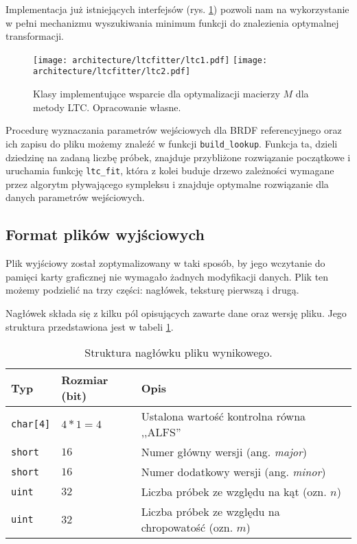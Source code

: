 \documentclass[../main.tex]{subfiles}
\newcommand{\graphvizscale}{0.09}
\begin{document}
Implementacja już istniejących interfejsów (rys. \ref{fig:LTCClassDiagram}) pozwoli nam na wykorzystanie w pełni mechanizmu wyszukiwania minimum funkcji do znalezienia optymalnej transformacji.

\begin{figure}[h]
    \centering
    \texttt{[image: architecture/ltcfitter/ltc1.pdf]}
    \texttt{[image: architecture/ltcfitter/ltc2.pdf]}
    \caption{Klasy implementujące wsparcie dla optymalizacji macierzy $M$ dla metody LTC. Opracowanie własne.}
    \label{fig:LTCClassDiagram}
\end{figure}

Procedurę wyznaczania parametrów wejściowych dla BRDF referencyjnego oraz ich zapisu do pliku możemy znaleźć w funkcji \texttt{build\_lookup}. Funkcja ta, dzieli dziedzinę na zadaną liczbę próbek, znajduje przybliżone rozwiązanie początkowe i uruchamia funkcję \texttt{ltc\_fit}, która z kolei buduje drzewo zależności wymagane przez algorytm pływającego sympleksu i znajduje optymalne rozwiązanie dla danych parametrów wejściowych.

\subsection{Format plików wyjściowych}

Plik wyjściowy został zoptymalizowany w taki sposób, by jego wczytanie do pamięci karty graficznej nie wymagało żadnych modyfikacji danych. Plik ten możemy podzielić na trzy części: nagłówek, teksturę pierwszą i drugą.

Nagłówek składa się z kilku pól opisujących zawarte dane oraz wersję pliku. Jego struktura przedstawiona jest w tabeli \ref{tab:alf_header}.

\begin{table}[h]
    \centering
    \begin{tabular}{|l|l|l|}
        \hline
        Typ & Rozmiar (bit) & Opis \\ \hline 
        \texttt{char[4]} & $4*1=4$ & Ustalona wartość kontrolna równa ,,ALFS'' \\ \hline
        \texttt{short} & $16$ & Numer główny wersji (ang. \textit{major}) \\ \hline
        \texttt{short} & $16$ & Numer dodatkowy wersji  (ang. \textit{minor}) \\ \hline
        \texttt{uint} & $32$ & Liczba próbek ze względu na kąt (ozn. $n$) \\ \hline
        \texttt{uint} & $32$ & Liczba próbek ze względu na chropowatość (ozn. $m$) \\ \hline
    \end{tabular}
    \caption{Struktura nagłówku pliku wynikowego.}
    \label{tab:alf_header}
\end{table}
\end{document}
